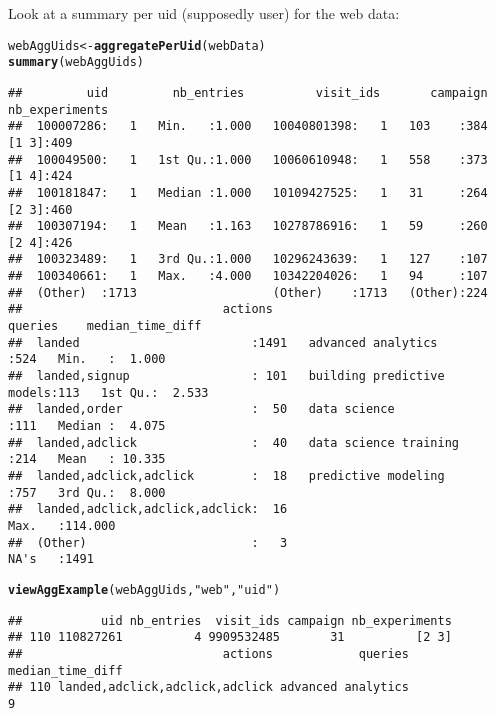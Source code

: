 \documentclass{article}\usepackage[]{graphicx}\usepackage[]{color}
\makeatletter
\newcommand{\hlstr}[1]{\textcolor[rgb]{0.192,0.494,0.8}{#1}}%
\newcommand{\hlstd}[1]{\textcolor[rgb]{0.345,0.345,0.345}{#1}}%
\newcommand{\hlkwb}[1]{\textcolor[rgb]{0.69,0.353,0.396}{#1}}%
\newcommand{\hlkwd}[1]{\textcolor[rgb]{0.737,0.353,0.396}{\textbf{#1}}}%
\newenvironment{kframe}{%
 \def\at@end@of@kframe{}%
 \ifinner\ifhmode%
  \def\at@end@of@kframe{\end{minipage}}%
  \begin{minipage}{\columnwidth}%
 \fi\fi%
 \def\FrameCommand##1{\hskip\@totalleftmargin \hskip-\fboxsep
 \colorbox{shadecolor}{##1}\hskip-\fboxsep
     \hskip-\linewidth \hskip-\@totalleftmargin \hskip\columnwidth}%
 \MakeFramed {\advance\hsize-\width
   \@totalleftmargin\z@ \linewidth\hsize
   \@setminipage}}%
 {\par\unskip\endMakeFramed%
 \at@end@of@kframe}
\newenvironment{knitrout}{}{} %
\makeatother
\begin{document}
Look at a summary per uid (supposedly user) for the web data:
\begin{knitrout}
\color{fgcolor}\begin{kframe}
\begin{alltt}
\hlstd{webAggUids} \hlkwb{<-} \hlkwd{aggregatePerUid}\hlstd{(webData)}
\hlkwd{summary}\hlstd{(webAggUids)}
\end{alltt}
\begin{verbatim}
##         uid         nb_entries          visit_ids       campaign   nb_experiments
##  100007286:   1   Min.   :1.000   10040801398:   1   103    :384   [1 3]:409     
##  100049500:   1   1st Qu.:1.000   10060610948:   1   558    :373   [1 4]:424     
##  100181847:   1   Median :1.000   10109427525:   1   31     :264   [2 3]:460     
##  100307194:   1   Mean   :1.163   10278786916:   1   59     :260   [2 4]:426     
##  100323489:   1   3rd Qu.:1.000   10296243639:   1   127    :107                 
##  100340661:   1   Max.   :4.000   10342204026:   1   94     :107                 
##  (Other)  :1713                   (Other)    :1713   (Other):224                 
##                            actions                           queries    median_time_diff 
##  landed                        :1491   advanced analytics        :524   Min.   :  1.000  
##  landed,signup                 : 101   building predictive models:113   1st Qu.:  2.533  
##  landed,order                  :  50   data science              :111   Median :  4.075  
##  landed,adclick                :  40   data science training     :214   Mean   : 10.335  
##  landed,adclick,adclick        :  18   predictive modeling       :757   3rd Qu.:  8.000  
##  landed,adclick,adclick,adclick:  16                                    Max.   :114.000  
##  (Other)                       :   3                                    NA's   :1491
\end{verbatim}
\begin{alltt}
\hlkwd{viewAggExample}\hlstd{(webAggUids,} \hlstr{"web"}\hlstd{,} \hlstr{"uid"}\hlstd{)}
\end{alltt}
\begin{verbatim}
##           uid nb_entries  visit_ids campaign nb_experiments
## 110 110827261          4 9909532485       31          [2 3]
##                            actions            queries median_time_diff
## 110 landed,adclick,adclick,adclick advanced analytics                9
\end{verbatim}
\end{kframe}
\end{knitrout}
\end{document}
